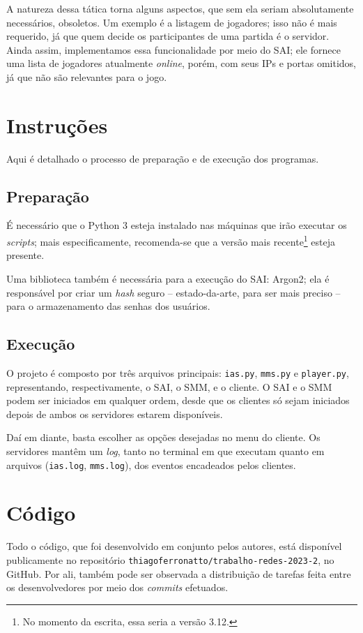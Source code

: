 \documentclass{article}
\begin{document}
\begin{multicols}{2}
    A natureza dessa tática torna alguns aspectos, que sem ela seriam absolutamente necessários, obsoletos. Um exemplo é a listagem de jogadores; isso não é mais requerido, já que quem decide os participantes de uma partida é o servidor. Ainda assim, implementamos essa funcionalidade por meio do SAI; ele fornece uma lista de jogadores atualmente \textit{online}, porém, com seus IPs e portas omitidos, já que não são relevantes para o jogo.
    
    \section{Instruções}
    
    Aqui é detalhado o processo de preparação e de execução dos programas.
    
    \subsection{Preparação}
    
    É necessário que o Python 3 esteja instalado nas máquinas que irão executar os \textit{scripts}; mais especificamente, recomenda-se que a versão mais recente\footnote{No momento da escrita, essa seria a versão 3.12.} esteja presente.
    
    Uma biblioteca também é necessária para a execução do SAI: Argon2; ela é responsável por criar um \textit{hash} seguro -- estado-da-arte, para ser mais preciso -- para o armazenamento das senhas dos usuários.
    
    \subsection{Execução}
    
    O projeto é composto por três arquivos principais: \texttt{ias.py}, \texttt{mms.py} e \texttt{player.py}, representando, respectivamente, o SAI, o SMM, e o cliente. O SAI e o SMM podem ser iniciados em qualquer ordem, desde que os clientes só sejam iniciados depois de ambos os servidores estarem disponíveis.
    
    Daí em diante, basta escolher as opções desejadas no menu do cliente. Os servidores mantêm um \textit{log}, tanto no terminal em que executam quanto em arquivos (\texttt{ias.log}, \texttt{mms.log}), dos eventos encadeados pelos clientes.
    
    \section{Código}
    
    Todo o código, que foi desenvolvido em conjunto pelos autores, está disponível publicamente no repositório \texttt{thiagoferronatto/trabalho-redes-2023-2}, no GitHub. Por ali, também pode ser observada a distribuição de tarefas feita entre os desenvolvedores por meio dos \textit{commits} efetuados.
  \end{multicols}
\end{document}
